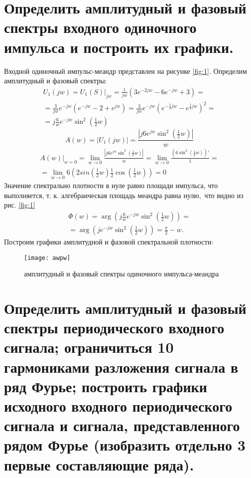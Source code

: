 \documentclass[a4paper,14pt ]{article} %
\begin{document}
    \section{Определить амплитудный и фазовый спектры входного одиночного импульса и построить их графики.}
    Входной одиночный импульс-меандр представлен на рисунке \ref{fig:1}.
    Определим амплитудный и фазовый спектры:
    \begin{multline}
        U_1(jw) = U_1(S)|_{jw} = \frac{1}{jw}\left(3e^{-2jw} - 6e^{-jw} + 3\right) = \\ 
         = \frac{3}{jw}e^{-jw}(e^{-jw} - 2 + e^{jw}) = 
         \frac{3}{jw}e^{-jw}\left(e^{-\frac{1}{2}jw} - e^{\frac12jw}\right)^2 = \\
         = j\frac{6}{w}e^{-jw}\sin^2\left(\frac12w\right)
    \end{multline} 
    \begin{equation}
        A(w) = \left| U_1(jw)\right| = 
        \frac{|j6e^{jw}\sin^2\left(\frac12w\right)
        |}{w} 
    \end{equation}
    \begin{multline*}
        A(w)|_{w=0}=\lim\limits_{w \to 0}
        \frac{|j6e^{jw}\sin^2\left(\frac12w\right)
        |}{w} = \lim\limits_{w \to 0}
        \frac{\left(6\sin^2\left(\frac12w\right)\right)'
        }{1} = \\
        = \lim\limits_{w \to 0}6\left(2sin\left(\frac12w\right)
        \frac12\cos\left(\frac12w\right)\right) = 0
    \end{multline*}
    \indent Значение спектрально плотности в нуле равно площади импульса, 
    что выполняется, т. к. алгебраическая площадь меандра равна нулю,\
    что видно из рис. \ref{fig:1}
    \begin{multline}
        \Phi(w) = \arg\left(
            j\frac{6}{w}e^{-jw}\sin^2\left(\frac12w\right)
            \right) = \\ = \arg\left(je^{-jw}\sin^2\left(\frac12w\right)\right) = 
            \frac{\pi}2 - w.
    \end{multline}
    \indent Построим графики амплитудной и фазовой спектральной плотности:
    \begin{figure}[H]
        \texttt{[image: awpw]}
        \centering
        \caption{амплитудный и фазовый спектры одиночного импульса-меандра}
        \label{fig:6}
    \end{figure}
    \newpage
    \section{Определить амплитудный и фазовый спектры периодического 
    входного сигнала;
     ограничиться 10 гармониками разложения сигнала в ряд Фурье; 
     построить графики исходного входного периодического сигнала и сигнала, представленного рядом Фурье 
    (изобразить отдельно 3 первые составляющие ряда).}
    
\end{document}
